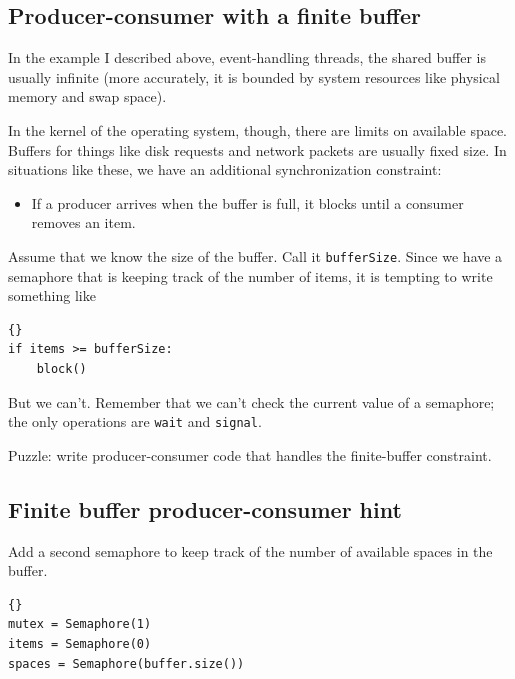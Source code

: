 \documentclass{book}
\newcommand{\clearemptydoublepage}{\newpage\cleardoublepage}
\begin{document}
\subsection{Producer-consumer with a finite buffer}

In the example I described above, event-handling threads,
the shared buffer is usually infinite (more accurately, it is
bounded by system resources like physical memory and swap
space).

In the kernel of the operating system, though, there are
limits on available space.  Buffers for things like disk
requests and network packets are usually fixed size.  In
situations like these, we have an additional synchronization
constraint:

\begin{itemize}

\item If a producer arrives when the buffer is full, it
blocks until a consumer removes an item.

\end{itemize}

Assume that we know the size of the buffer.  Call it
{\tt bufferSize}.  Since we have a semaphore that is keeping
track of the number of items, it is tempting to write something
like 

\begin{latin}
\begin{latin}
\begin{lstlisting}[title={Broken finite buffer solution}]{}
if items >= bufferSize:
    block()
\end{lstlisting}
\end{latin}
\end{latin}

But we can't.  Remember that we can't check the current
value of a semaphore; the only operations are {\tt wait}
and {\tt signal}.

Puzzle: write producer-consumer code that handles the finite-buffer
constraint.

\clearemptydoublepage
\subsection{Finite buffer producer-consumer hint}

Add a second semaphore to keep track of the number of
available spaces in the buffer.

\begin{latin}
\begin{latin}
\begin{lstlisting}[title={Finite-buffer producer-consumer initialization}]{}
mutex = Semaphore(1)
items = Semaphore(0)
spaces = Semaphore(buffer.size())
\end{lstlisting}
\end{latin}
\end{latin}
\end{document}
